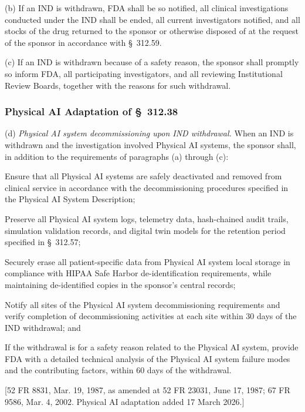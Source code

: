 \documentclass[11pt]{article}
\begin{document}
(b) If an IND is withdrawn, FDA shall be so notified, all clinical investigations conducted under the IND shall be ended, all current investigators notified, and all stocks of the drug returned to the sponsor or otherwise disposed of at the request of the sponsor in accordance with \S~312.59.

(c) If an IND is withdrawn because of a safety reason, the sponsor shall promptly so inform FDA, all participating investigators, and all reviewing Institutional Review Boards, together with the reasons for such withdrawal.

\subsubsection{Physical AI Adaptation of \S~312.38}

(d) \textit{Physical AI system decommissioning upon IND withdrawal.} When an IND is withdrawn and the investigation involved Physical AI systems, the sponsor shall, in addition to the requirements of paragraphs (a) through (c):

\begin{description}[leftmargin=0.8cm,style=sameline]
\item[(i)] Ensure that all Physical AI systems are safely deactivated and removed from clinical service in accordance with the decommissioning procedures specified in the Physical AI System Description;
\item[(ii)] Preserve all Physical AI system logs, telemetry data, hash-chained audit trails, simulation validation records, and digital twin models for the retention period specified in \S~312.57;
\item[(iii)] Securely erase all patient-specific data from Physical AI system local storage in compliance with HIPAA Safe Harbor de-identification requirements, while maintaining de-identified copies in the sponsor's central records;
\item[(iv)] Notify all sites of the Physical AI system decommissioning requirements and verify completion of decommissioning activities at each site within 30 days of the IND withdrawal; and
\item[(v)] If the withdrawal is for a safety reason related to the Physical AI system, provide FDA with a detailed technical analysis of the Physical AI system failure modes and the contributing factors, within 60 days of the withdrawal.
\end{description}

[52 FR 8831, Mar. 19, 1987, as amended at 52 FR 23031, June 17, 1987; 67 FR 9586, Mar. 4, 2002. Physical AI adaptation added 17 March 2026.]
\end{document}
